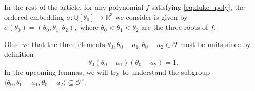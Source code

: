 \documentclass[11pt,letterpaper]{amsart}
\theoremstyle{definition}
\theoremstyle{remark}
\newcommand{\cal}[1]{\mathcal{#1}}
\newcommand{\bb}[1]{\mathbb{#1}}
\newcommand{\R}{\bb R}
\newcommand{\calO}{\cal O}
\begin{document}
	{In the rest of the article,
	for any polynomial $f$ satisfying \cref{eq:duke_poly}, the ordered embedding $\sigma : \mathbb{Q}[\theta_0] \rightarrow \R^3$ we consider is given by $\sigma(\theta_0) = (\theta_0,\theta_1,\theta_2),$
	where $\theta_0< \theta_1< \theta_2$ are the three roots of $f$.}
	
\noindent Observe that the three elements $\theta_0,\theta_0-a_1, \theta_0-a_2 \in \calO$ must 
	be units 
	since by definition
	\begin{equation}
		\theta_0(\theta_0-a_1)(\theta_0-a_2) = 1.
		\label{eq:unit-relation}
	\end{equation}
	In the upcoming lemmas, we will try to understand
	the subgroup $\langle \theta_0 , \theta_0-a_1 ,\theta_0-a_2 \rangle \subseteq \calO^{\times}$.
	
\end{document}
